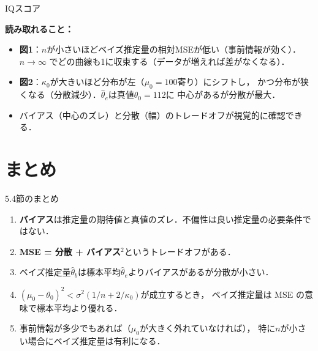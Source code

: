 \documentclass[lualatex,ja=standard,a4paper,12pt]{bxjsarticle}
\begin{document}
\begin{exbox}{IQスコア}
\begin{center}
\end{center}

\medskip
\noindent
\textbf{読み取れること：}
\begin{itemize}
  \item \textbf{図1}：$n$が小さいほどベイズ推定量の相対MSEが低い（事前情報が効く）．
        $n \to \infty$ でどの曲線も1に収束する（データが増えれば差がなくなる）．
  \item \textbf{図2}：$\kappa_0$が大きいほど分布が左（$\mu_0=100$寄り）にシフトし，
        かつ分布が狭くなる（分散減少）．$\hat\theta_e$は真値$\theta_0=112$に
        中心があるが分散が最大．
  \item バイアス（中心のズレ）と分散（幅）のトレードオフが視覚的に確認できる．
\end{itemize}

\end{exbox}

\section{まとめ}

\begin{thmbox}{5.4節のまとめ}
\begin{enumerate}
  \item \textbf{バイアス}は推定量の期待値と真値のズレ．不偏性は良い推定量の必要条件ではない．

  \item \textbf{MSE = 分散 + バイアス$^2$}というトレードオフがある．

  \item ベイズ推定量$\hat{\theta}_b$は標本平均$\hat{\theta}_e$よりバイアスがあるが分散が小さい．

  \item $(\mu_0 - \theta_0)^2 < \sigma^2(1/n + 2/\kappa_0)$が成立するとき，
  ベイズ推定量は MSE の意味で標本平均より優れる．

  \item 事前情報が多少でもあれば（$\mu_0$が大きく外れていなければ），
  特に$n$が小さい場合にベイズ推定量は有利になる．
\end{enumerate}
\end{thmbox}
\end{document}
